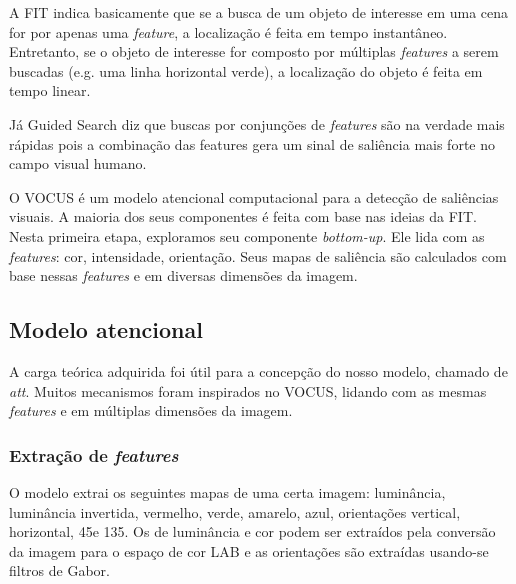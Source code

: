 \documentclass[11pt]{article}
\newcommand{\tit}[1]{\textit{#1}}
\begin{document}
A FIT indica basicamente que se a busca de um objeto de interesse em uma
cena for por apenas uma \tit{feature}, a localização é feita em tempo
instantâneo.
Entretanto, se o objeto de interesse for composto por múltiplas \tit{features}
a serem buscadas (e.g. uma linha horizontal verde),
a localização do objeto é feita em tempo linear.

Já Guided Search diz que buscas por conjunções de \tit{features} são na
verdade mais rápidas pois a combinação das features gera um sinal de
saliência mais forte no campo visual humano.

O VOCUS é um modelo atencional computacional para a detecção de saliências
visuais.
A maioria dos seus componentes é feita com base nas ideias da FIT.
Nesta primeira etapa, exploramos seu componente \tit{bottom-up}.
Ele lida com as \tit{features}: cor, intensidade, orientação.
Seus mapas de saliência são calculados com base nessas \tit{features}
e em diversas dimensões da imagem.

\subsection{Modelo atencional}
A carga teórica adquirida foi útil para a concepção do nosso modelo,
chamado de \tit{att}.
Muitos mecanismos foram inspirados no VOCUS, lidando com as mesmas
\tit{features} e em múltiplas dimensões da imagem.

\subsubsection{Extração de \tit{features}}
O modelo extrai os seguintes mapas de uma certa imagem:
luminância, luminância invertida, vermelho, verde, amarelo, azul,
orientações vertical, horizontal, 45\degree e 135\degree.
Os de luminância e cor podem ser extraídos pela conversão da imagem para o
espaço de cor LAB e as orientações são extraídas usando-se filtros de Gabor.
\end{document}
